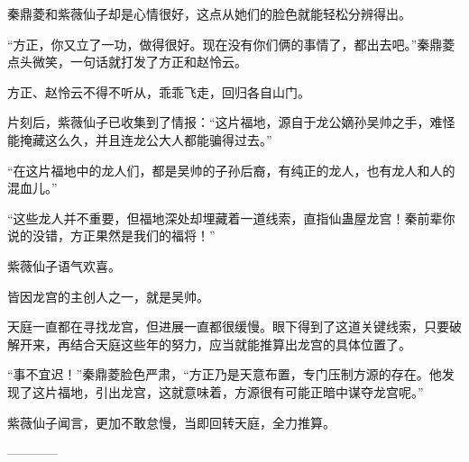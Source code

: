 \begin{this_body}
秦鼎菱和紫薇仙子却是心情很好，这点从她们的脸色就能轻松分辨得出。

“方正，你又立了一功，做得很好。现在没有你们俩的事情了，都出去吧。”秦鼎菱点头微笑，一句话就打发了方正和赵怜云。

方正、赵怜云不得不听从，乖乖飞走，回归各自山门。

片刻后，紫薇仙子已收集到了情报：“这片福地，源自于龙公嫡孙吴帅之手，难怪能掩藏这么久，并且连龙公大人都能骗得过去。”

“在这片福地中的龙人们，都是吴帅的子孙后裔，有纯正的龙人，也有龙人和人的混血儿。”

“这些龙人并不重要，但福地深处却埋藏着一道线索，直指仙蛊屋龙宫！秦前辈你说的没错，方正果然是我们的福将！”

紫薇仙子语气欢喜。

皆因龙宫的主创人之一，就是吴帅。

天庭一直都在寻找龙宫，但进展一直都很缓慢。眼下得到了这道关键线索，只要破解开来，再结合天庭这些年的努力，应当就能推算出龙宫的具体位置了。

“事不宜迟！”秦鼎菱脸色严肃，“方正乃是天意布置，专门压制方源的存在。他发现了这片福地，引出龙宫，这就意味着，方源很有可能正暗中谋夺龙宫呢。”

紫薇仙子闻言，更加不敢怠慢，当即回转天庭，全力推算。

------------

\end{this_body}

